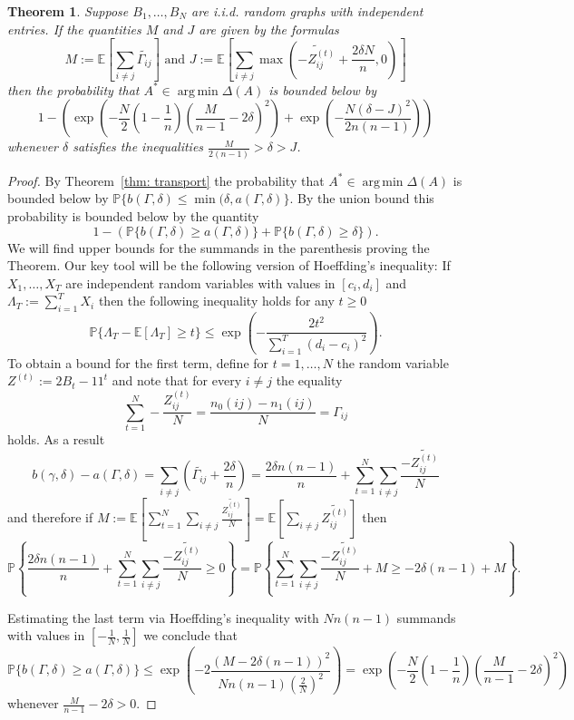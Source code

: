 \documentclass[12pt]{amsart}
\newtheorem{theorem}[lemma]{Theorem}
\theoremstyle{remark}
\DeclareMathOperator*{\argmin}{arg\,min}
\newcommand{\PP}{\mathbb{P}}
\newcommand{\EE}{\mathbb{E}}
\begin{document}
\begin{theorem} Suppose $B_1,\dots, B_N$ are i.i.d. random graphs with independent entries. If the quantities $M$ and $J$ are given by the formulas 
\[ M:=\EE\left[\sum_{i\neq j}\widetilde{\Gamma_{ij}}\right]\text{ and }J:=\EE\left[\sum_{i\neq j}\max\left(\widetilde{-Z_{ij}^{(t)}}+\frac{2\delta N}{n},0\right)\right]\]
then the probability that $A^*\in \argmin \Delta(A)$ is bounded below by
\[1-\left(\exp\left( -\frac{N}{2}\left(1-\frac{1}{n}\right) \left(\frac{M}{n-1}-2\delta\right)^2\right)+\exp\left(-\frac{N(\delta-J)^2}{2n(n-1)}\right)\right)\]
whenever $\delta$ satisfies the inequalities $\frac{M}{2(n-1)}>\delta>J$. 
\end{theorem}

\begin{proof} By Theorem~\ref{thm: transport} the probability that $A^*\in \argmin \Delta(A)
$ is bounded below by $\PP\{b(\Gamma,\delta)\leq \min(\delta,a(\Gamma,\delta)\}$. By the union bound this probability is bounded below by the quantity
\[1-\left(\PP\{b(\Gamma,\delta)\geq a(\Gamma,\delta)\}+ \PP\{b(\Gamma,\delta)\geq \delta\}\right).\]
We will find upper bounds for the summands in the parenthesis proving the Theorem. Our key tool will be the following version of Hoeffding's inequality: If $X_1,\dots, X_T$ are independent random variables with values in $[c_i,d_i]$ and $\Lambda_T:=\sum_{i=1}^T X_i$ then the following inequality holds for any $t\geq 0$ 
\[\PP\{\Lambda_T-\EE[\Lambda_T]\geq t\}\leq \exp\left(-\frac{2t^2}{\sum_{i=1}^T (d_i-c_i)^2}\right).\]
To obtain a bound for the first term, define for $t=1,\dots, N$ the random variable $Z^{(t)}:=2B_t-11^t$ and note that for every $i\neq j$ the equality
\[\sum_{t=1}^N-\frac{Z_{ij}^{(t)}}{N} = \frac{n_0(ij)-n_1(ij)}{N}=\Gamma_{ij}\]
holds. As a result
\[b(\gamma,\delta)-a(\Gamma,\delta) = \sum_{i\neq j} \left(\widetilde{\Gamma_{ij}}+\frac{2\delta}{n}\right)= \frac{2\delta n(n-1)}{n} + \sum_{t=1}^N \sum_{i\neq j} \frac{-\widetilde{Z^{(t)}_{ij}}}{N}\]
and therefore if $M:=\EE\left[\sum_{t=1}^N \sum_{i\neq j} \frac{\widetilde{Z^{(t)}_{ij}}}{N}\right]=\EE\left[\sum_{i\neq j} \widetilde{Z^{(t)}_{ij}}\right]$ then 
\[\PP\left\{\frac{2\delta n(n-1)}{n} + \sum_{t=1}^N \sum_{i\neq j} \frac{-\widetilde{Z^{(t)}_{ij}}}{N}\geq 0\right\} = \PP\left\{\sum_{t=1}^N \sum_{i\neq j} \frac{-\widetilde{Z^{(t)}_{ij}}}{N} + M \geq -2\delta (n-1) + M \right\}.\]

Estimating the last term via Hoeffding's inequality with $Nn(n-1)$ summands with values in $\left[-\frac{1}{N},\frac{1}{N}\right]$ we conclude that 
\[\PP\{b(\Gamma,\delta)\geq a(\Gamma,\delta)\}\leq \exp\left(-2\frac{(M-2\delta(n-1))^2}{Nn(n-1)(\frac{2}{N})^2}\right)=\exp\left( -\frac{N}{2}\left(1-\frac{1}{n}\right) \left(\frac{M}{n-1}-2\delta\right)^2\right) \]
whenever $\frac{M}{n-1}-2\delta>0$.


\end{proof}
\end{document}
